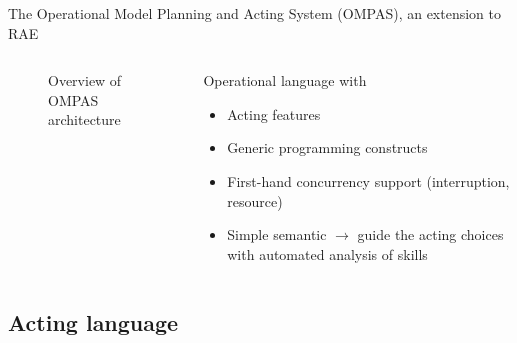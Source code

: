 \begin{frame}{The Operational Model Planning and Acting System (OMPAS), an extension to RAE}
\begin{columns}[t]
\begin{column}{0.5\textwidth}
\begin{figure}
        \caption{Overview of OMPAS architecture}
    \end{figure}
            
        \end{column}
        \pause
        \begin{column}{0.5\textwidth}
        Operational language with
        \begin{itemize}
            \item Acting features
            \item Generic programming constructs
            \item First-hand concurrency support (interruption, resource)
            \item Simple semantic $\rightarrow$ guide the acting choices with automated analysis of skills
        \end{itemize}
        \end{column}
    \end{columns}
\end{frame}

\subsection{Acting language}

